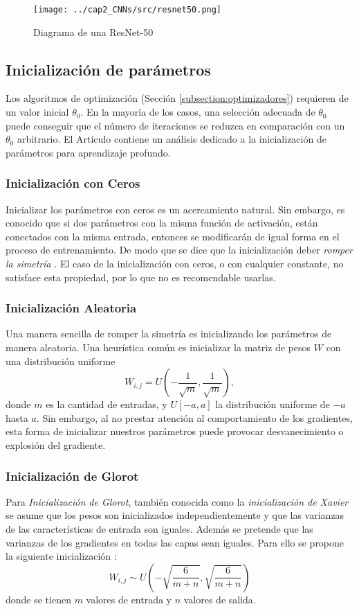 \begin{figure}[H]
    \centering
    \texttt{[image: ../cap2\_CNNs/src/resnet50.png]}
    \caption{Diagrama de una ResNet-50} 
\end{figure}
\subsection{Inicialización de parámetros}
Los algoritmos de optimización (Sección \ref{subsection:optimizadores}) requieren de un valor inicial $\theta_0$. En la mayoría de los casos, una selección adecuada de $\theta_0$ puede conseguir que el número de iteraciones se reduzca en comparación con un $\theta_0$ arbitrario. El Artículo \cite{weight_initialization} contiene un análisis dedicado a la inicialización de parámetros para aprendizaje profundo.

\subsubsection{Inicialización con Ceros}
Inicializar los parámetros con ceros es un acercamiento natural. Sin embargo, es conocido que si dos parámetros con la misma función de activación, están conectados con la misma entrada, entonces se modificarán de igual forma en el proceso de entrenamiento. De modo que se dice que la inicialización deber \textsl{romper la simetría} \cite{deeplearningbook}. El caso de la inicialización con ceros, o con cualquier constante, no satisface esta propiedad, por lo que no es recomendable usarlas.
\subsubsection{Inicialización Aleatoria}
Una manera sencilla de romper la simetría es  inicializando los parámetros de manera aleatoria. Una heurística común es inicializar la matriz de pesos $W$ con una distribución uniforme
\begin{equation}
    W_{i,j} = U\left(-\frac{1}{\sqrt{m}}, \frac{1}{\sqrt{m}}\right),
\end{equation}
donde $m$ es la cantidad de entradas, y $U[-a,a]$ la distribución uniforme de $-a$ hasta $a$. Sin embargo, al no prestar atención al comportamiento de los gradientes, esta forma de inicializar nuestros parámetros puede provocar desvanecimiento o  explosión del gradiente.
\subsubsection{Inicialización de Glorot}
Para \textsl{Inicialización de Glorot}, también conocida como la \textsl{inicialización de Xavier} \cite{glorot_initialization} se asume que los pesos son inicializados independientemente y que las varianzas de las características de entrada son iguales. Además se pretende que las varianzas de los gradientes en todas las capas sean iguales. Para ello se propone la siguiente inicialización :
\begin{equation}
    W_{i,j} \sim U\left(-\sqrt{\frac{6}{m+n}}, \sqrt{\frac{6}{m+n}}\right)
\end{equation}
donde se tienen $m$ valores de entrada y $n$ valores de salida.

